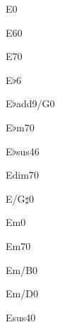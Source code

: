 
\begin{chordbox}{E}{0}
\end{chordbox}\cspace
%
\begin{chordbox}{E6}{0}
\end{chordbox}\cspace
%
\begin{chordbox}{E7}{0}
\end{chordbox}\cspace
%
\begin{chordbox}{E$\flat$}{6}
\end{chordbox}\cspace
%
\begin{chordbox}{E$\flat$add9/G}{0}
\end{chordbox}\cspace
%
\begin{chordbox}{E$\flat$m7}{0}
\end{chordbox}\cspace
%
\begin{chordbox}{E$\flat$sus4}{6}
\end{chordbox}\cspace
%
\begin{chordbox}{Edim7}{0}
\end{chordbox}\cspace
%
\begin{chordbox}{E/G$\sharp$}{0}
\end{chordbox}\cspace
%
\begin{chordbox}{Em}{0}
\end{chordbox}\cspace
%
\begin{chordbox}{Em7}{0}
\end{chordbox}\cspace
%
\begin{chordbox}{Em/B}{0}
\end{chordbox}\cspace
%
\begin{chordbox}{Em/D}{0}
\end{chordbox}\cspace
%
\begin{chordbox}{Esus4}{0}
\end{chordbox}\cspace

